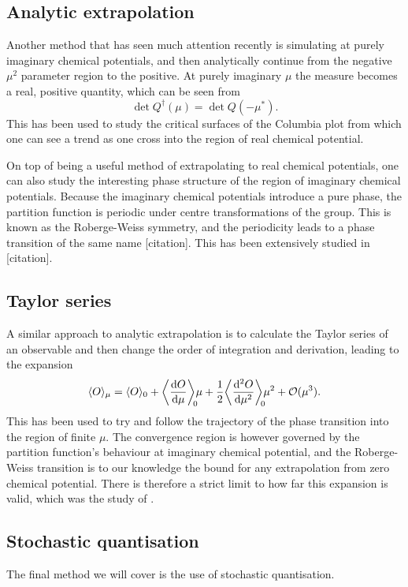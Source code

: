 \subsection{Analytic extrapolation}


Another method that has seen much attention recently is simulating at purely
imaginary chemical potentials, and then analytically continue from the negative
$\mu^2$ parameter region to the positive. At purely imaginary $\mu$ the measure
becomes a real, positive quantity, which can be seen from
%
\begin{equation}
  \det Q^{\dagger} (\mu) = \det Q(-\mu^*).
\end{equation}
%
This has been used to study the critical surfaces of the Columbia plot from
which one can see a trend as one cross into the region of real chemical
potential.

On top of being a useful method of extrapolating to real chemical potentials,
one can also study the interesting phase structure of the region of imaginary
chemical potentials. Because the imaginary chemical potentials introduce a pure
phase, the partition function is periodic under centre transformations of the
group. This is known as the Roberge-Weiss symmetry, and the periodicity leads to
a phase transition of the same name [citation]. This has been extensively studied in
[citation].

\subsection{Taylor series}

A similar approach to analytic extrapolation is to calculate the Taylor series
of an observable and then change the order of integration and derivation,
leading to the expansion
%
\begin{equation}
  \langle O \rangle_{\mu} = \langle O \rangle_{0}
   + \bigg\langle \frac{\mathrm{d} O}{\mathrm{d} \mu} \bigg\rangle_{\mathclap{0}} \mu
   + \frac{1}{2} \bigg\langle \frac{\mathrm{d}^2 O}{\mathrm{d} \mu^2} \bigg\rangle_{\mathclap{0}} \mu^2
   + \mathcal{O}(\mu^3).
\end{equation}
%
This has been used to try and follow the trajectory of the phase transition into
the region of finite $\mu$. The convergence region is however governed by the
partition function's behaviour at imaginary chemical potential, and the
Roberge-Weiss transition is to our knowledge the bound for any extrapolation
from zero chemical potential. There is therefore a strict limit to how far this
expansion is valid, which was the study of \citep{Osborn:2008eg}.

\subsection{Stochastic quantisation}

The final method we will cover is the use of stochastic quantisation.
